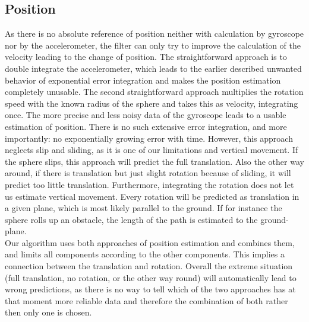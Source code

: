 \documentclass[letterpaper, 10 pt, conference]{ieeeconf}  %
\begin{document}
\subsection{Position}
As there is no absolute reference of position neither with calculation by gyroscope nor by the accelerometer, the filter can only try to improve the calculation of the velocity leading to the change of position. 
The straightforward approach is to double integrate the accelerometer, which leads to the earlier described unwanted behavior of exponential error integration and makes the position estimation completely unusable. 
The second straightforward approach multiplies the rotation speed with the known radius of the sphere and takes this as velocity, integrating once.
The more precise and less noisy data of the gyroscope leads to a usable estimation of position. 
There is no such extensive error integration, and more importantly: no exponentially growing error with time. However, this approach neglects slip and sliding, as it is one of our limitations and vertical movement. 
If the sphere slips, this approach will predict the full translation.
Also the other way around, if there is translation but just slight rotation because of sliding, it will predict too little translation. 
Furthermore, integrating the rotation does not let us estimate vertical movement.
Every rotation will be predicted as translation in a given plane, which is most likely parallel to the ground. 
If for instance the sphere rolls up an obstacle, the length of the path is estimated to the ground-plane.\\
Our algorithm uses both approaches of position estimation and combines them, and limits all components according to the other components. 
This implies a connection between the translation and rotation. 
Overall the extreme situation (full translation, no rotation, or the other way round) will automatically lead to wrong predictions, as there is no way to tell which of the two approaches has at that moment more reliable data and therefore the combination of both rather then only one is chosen.
\end{document}
